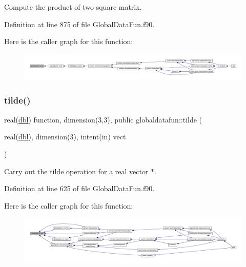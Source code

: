 Compute the product of two square matrix. 



Definition at line 875 of file Global\+Data\+Fun.\+f90.

Here is the caller graph for this function\+:\nopagebreak
\begin{figure}[H]
\begin{center}
\leavevmode
\includegraphics[width=350pt]{namespaceglobaldatafun_afe68f9e5d61e5e7844a0a4b225bb3825_icgraph}
\end{center}
\end{figure}
\mbox{\label{namespaceglobaldatafun_aabcfb273a99323881aa160da1f44a561}} 
\subsubsection{\texorpdfstring{tilde()}{tilde()}}
{\footnotesize\ttfamily real(\hyperlink{namespaceglobaldatafun_a5008801201dd34f2af8eae07756befb4}{dbl}) function, dimension(3,3), public globaldatafun\+::tilde (\begin{DoxyParamCaption}\item[{real(\hyperlink{namespaceglobaldatafun_a5008801201dd34f2af8eae07756befb4}{dbl}), dimension(3), intent(in)}]{vect }\end{DoxyParamCaption})}



Carry out the tilde operation for a real vector $\ast$. 



Definition at line 625 of file Global\+Data\+Fun.\+f90.

Here is the caller graph for this function\+:\nopagebreak
\begin{figure}[H]
\begin{center}
\leavevmode
\includegraphics[width=350pt]{namespaceglobaldatafun_aabcfb273a99323881aa160da1f44a561_icgraph}
\end{center}
\end{figure}
\mbox{\label{namespaceglobaldatafun_a74b07978d9a6c644031fbb37b131f609}} 

